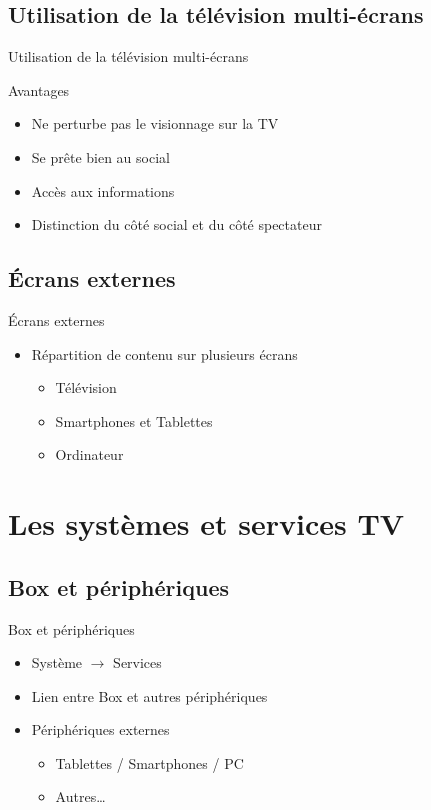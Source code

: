 \documentclass{beamer}
\begin{document}
	\subsection{Utilisation de la télévision multi-écrans}
	\begin{frame}{Utilisation de la télévision multi-écrans}
		\begin{exampleblock}{Avantages}
			\begin{itemize}
				\item Ne perturbe pas le visionnage sur la TV
				\item Se prête bien au social
				\item Accès aux informations
				\item Distinction du côté social et du côté spectateur
			\end{itemize}
		\end{exampleblock}
	\end{frame}
	\subsection{Écrans externes}
	\begin{frame}{Écrans externes}
\begin{itemize}
	\item Répartition de contenu sur plusieurs écrans
		\begin{itemize}
			\item Télévision
			\item Smartphones et Tablettes
			\item Ordinateur
		\end{itemize}
\end{itemize}
	\end{frame}
	\section{Les systèmes et services TV}
	\subsection{Box et périphériques}
	\begin{frame}{Box et périphériques}
		\begin{itemize}
			\item Système $\rightarrow$ Services
		\pause
			\item Lien entre Box et autres périphériques
		\pause
			\item Périphériques externes
				\begin{itemize}
					\item Tablettes / Smartphones / PC
					\item Autres\ldots
				\end{itemize}
		\end{itemize}
	\end{frame}
\end{document}
